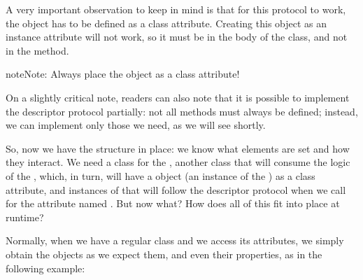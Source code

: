 \documentclass[a4paper,10pt,english]{sphinxmanual}
\begin{document}
A very important observation to keep in mind is that for this protocol to work, the
 object has to be defined as a class attribute. Creating this object as an instance
attribute will not work, so it must be in the body of the class, and not in the  method.

\begin{sphinxadmonition}{note}{Note:}
Always place the  object as a class attribute!
\end{sphinxadmonition}

On a slightly critical note, readers can also note that it is possible to implement the
descriptor protocol partially: not all methods must always be defined; instead, we can
implement only those we need, as we will see shortly.

So, now we have the structure in place: we know what elements are set and how they
interact. We need a class for the , another class that will consume the logic of
the , which, in turn, will have a  object (an instance of the
) as a class attribute, and instances of  that will follow the
descriptor protocol when we call for the attribute named . But now what?
How does all of this fit into place at runtime?

Normally, when we have a regular class and we access its attributes, we simply obtain the
objects as we expect them, and even their properties, as in the following example:

\begin{sphinxVerbatim}[commandchars=\\\{\}]
 
      
 
      
\end{sphinxVerbatim}
\end{document}
